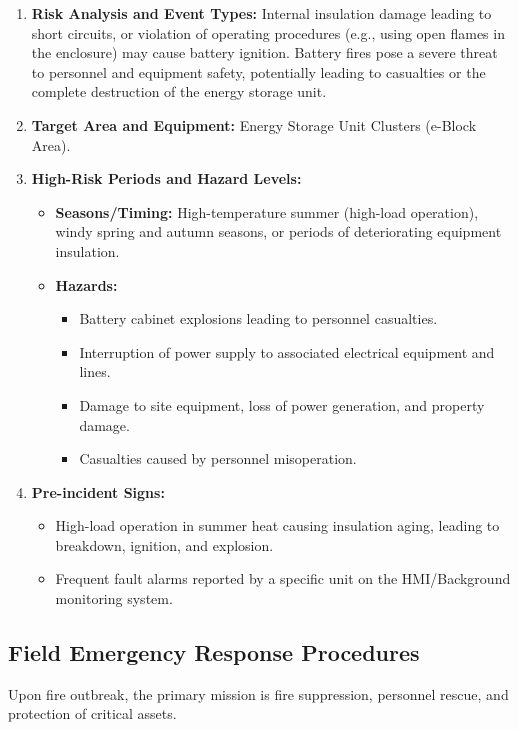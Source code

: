 \documentclass[11pt, a4paper]{article}
\begin{document}
\begin{enumerate}[label=\arabic*., leftmargin=2em]
    \item \textbf{Risk Analysis and Event Types:} 
    Internal insulation damage leading to short circuits, or violation of operating procedures (e.g., using open flames in the enclosure) may cause battery ignition. Battery fires pose a severe threat to personnel and equipment safety, potentially leading to casualties or the complete destruction of the energy storage unit.

    \item \textbf{Target Area and Equipment:} Energy Storage Unit Clusters (e-Block Area).

    \item \textbf{High-Risk Periods and Hazard Levels:}
    \begin{itemize}
        \item \textbf{Seasons/Timing:} High-temperature summer (high-load operation), windy spring and autumn seasons, or periods of deteriorating equipment insulation.
        \item \textbf{Hazards:} 
        \begin{itemize}
            \item Battery cabinet explosions leading to personnel casualties.
            \item Interruption of power supply to associated electrical equipment and lines.
            \item Damage to site equipment, loss of power generation, and property damage.
            \item Casualties caused by personnel misoperation.
        \end{itemize}
    \end{itemize}

    \item \textbf{Pre-incident Signs:}
    \begin{itemize}
        \item High-load operation in summer heat causing insulation aging, leading to breakdown, ignition, and explosion.
        \item Frequent fault alarms reported by a specific unit on the HMI/Background monitoring system.
    \end{itemize}
\end{enumerate}

\subsection*{Field Emergency Response Procedures}
Upon fire outbreak, the primary mission is fire suppression, personnel rescue, and protection of critical assets.
\end{document}
